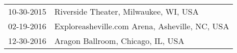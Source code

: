 \begin{supertabular}{ll}
 10-30-2015 &           Riverside Theater, Milwaukee, WI, USA \\
 02-19-2016 &  Exploreasheville.com Arena, Asheville, NC, USA \\
 12-30-2016 &               Aragon Ballroom, Chicago, IL, USA \\
\end{supertabular}
